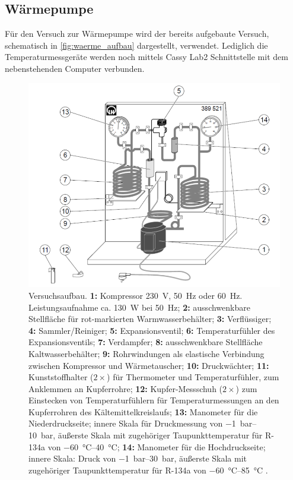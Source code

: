 \documentclass[english, ngerman]{scrartcl}
\begin{document}
\subsection{Wärmepumpe}
\label{subsec:anordnung_waermepumpe}

Für den Versuch zur Wärmepumpe wird der bereits aufgebaute Versuch, schematisch in \autoref{fig:waerme_aufbau} dargestellt, verwendet. Lediglich die Temperaturmessgeräte werden noch mittels Cassy Lab2 Schnittstelle mit dem nebenstehenden Computer verbunden.
%
\begin{figure}[H]
    \centering
    \begin{samepage}
        \includegraphics[width=0.8\linewidth]{fig/Waermepumpe_schematisch.png}
        \caption[Schematischer Aufbau Wärmepumpe]{Versuchsaufbau. \textbf{1:} Kompressor \SI{230}{V}, \SI{50}{Hz} oder \SI{60}{Hz}. Leistungsaufnahme ca. \SI{130}{W} bei \SI{50}{Hz}; \textbf{2:} ausschwenkbare Stellfläche für rot-markierten Warmwasserbehälter; \textbf{3:} Verflüssiger; \textbf{4:}
            Sammler/Reiniger; \textbf{5:} Expansionsventil; \textbf{6:} Temperaturfühler des Expansionsventils; \textbf{7:} Verdampfer; \textbf{8:} ausschwenkbare Stellfläche Kaltwasserbehälter; \textbf{9:} Rohrwindungen als elastische Verbindung zwischen Kompressor und Wärmetauscher; \textbf{10:} Druckwächter; \textbf{11:} Kunststoffhalter ($2\times$) für
            Thermometer und Temperaturfühler, zum Anklemmen an Kupferrohre; \textbf{12:} Kupfer-Messschuh ($2\times$)
            zum Einstecken von Temperaturfühlern für Temperaturmessungen an den Kupferrohren des Kältemittelkreislaufs; \textbf{13:} Manometer für die Niederdruckseite; innere Skala für Druckmessung von \SIrange{-1}{10}{\bar}, äußerste Skala mit zugehöriger Taupunkttemperatur für R-134a von \SIrange{-60}{40}{\celsius};
            \textbf{14:} Manometer für die Hochdruckseite; innere Skala: Druck von \SIrange{-1}{30}{\bar}, äußerste Skala mit
            zugehöriger Taupunkttemperatur für R-134a von \SIrange{-60}{85}{\celsius} \cite{ref:angabe_waerme}.}
        \label{fig:waerme_aufbau}
    \end{samepage}
\end{figure}
\end{document}
